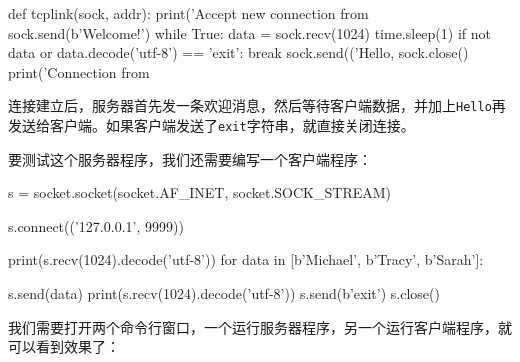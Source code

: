 \begin{pythoncode}
def tcplink(sock, addr):
    print('Accept new connection from %
    sock.send(b'Welcome!')
    while True:
        data = sock.recv(1024)
        time.sleep(1)
        if not data or data.decode('utf-8') == 'exit':
            break
        sock.send(('Hello, %
    sock.close()
    print('Connection from %
\end{pythoncode}

连接建立后，服务器首先发一条欢迎消息，然后等待客户端数据，并加上\texttt{Hello}再发送给客户端。如果客户端发送了\texttt{exit}字符串，就直接关闭连接。

要测试这个服务器程序，我们还需要编写一个客户端程序：

\begin{pythoncode}
s = socket.socket(socket.AF_INET, socket.SOCK_STREAM)

s.connect(('127.0.0.1', 9999))

print(s.recv(1024).decode('utf-8'))
for data in [b'Michael', b'Tracy', b'Sarah']:
    
    s.send(data)
    print(s.recv(1024).decode('utf-8'))
s.send(b'exit')
s.close()
\end{pythoncode}

我们需要打开两个命令行窗口，一个运行服务器程序，另一个运行客户端程序，就可以看到效果了：


